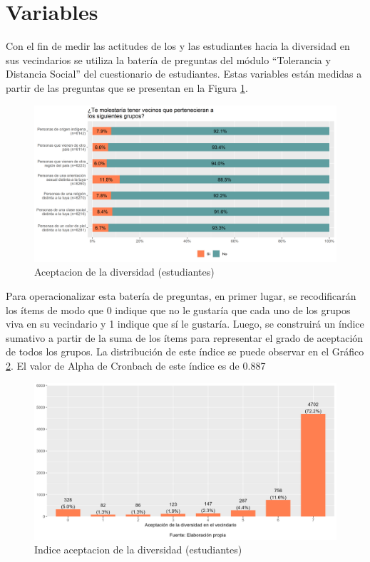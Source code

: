 \documentclass[12pt,twoside]{templates/facsothesis}
\begin{document}
\hypertarget{variables}{%
\section{Variables}\label{variables}}

Con el fin de medir las actitudes de los y las estudiantes hacia la diversidad en sus vecindarios se utiliza la batería de preguntas del módulo ``Tolerancia y Distancia Social'' del cuestionario de estudiantes. Estas variables están medidas a partir de las preguntas que se presentan en la Figura \ref{fig:dep-est}.

\begin{figure}[!ht]

{\centering \includegraphics[width=0.8\linewidth,]{IPO/output/graphs/div_est} 

}

\caption{Aceptacion de la diversidad (estudiantes)}\label{fig:dep-est}
\end{figure}

Para operacionalizar esta batería de preguntas, en primer lugar, se recodificarán los ítems de modo que 0 indique que no le gustaría que cada uno de los grupos viva en su vecindario y 1 indique que sí le gustaría. Luego, se construirá un índice sumativo a partir de la suma de los ítems para representar el grado de aceptación de todos los grupos. La distribución de este índice se puede observar en el Gráfico \ref{fig:ind-est}. El valor de Alpha de Cronbach de este índice es de 0.887

\begin{figure}[!ht]

{\centering \includegraphics[width=0.8\linewidth,]{IPO/output/graphs/ind_est} 

}

\caption{Indice aceptacion de la diversidad (estudiantes)}\label{fig:ind-est}
\end{figure}
\end{document}
